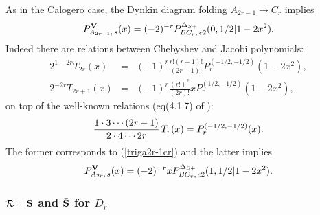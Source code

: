 \documentclass[a4paper,12pt]{article}
\begin{document}
As in the Calogero case, the Dynkin diagram folding $A_{2r-1}\to C_r$ implies
\begin{equation}
   P_{A_{2r-1},\,s}^{\bf V}(x)
   =(-2)^{-r}P_{BC_r,\,c2}^{\Delta_{S+}}(0,1/2|1-2x^2).
   \label{triga2r-1cr}
\end{equation}
Indeed there are relations between Chebyshev and Jacobi polynomials:
\begin{eqnarray}
   2^{1-2r}T_{2r}(x)&\!\!=\!\!&
   (-1)^r\frac{r!(r-1)!}{(2r-1)!}P_r^{(-1/2,-1/2)}(1-2x^2),
   \label{ChebJaco1}\\
%
   2^{-2r}T_{2r+1}(x)&\!\!=\!\!&
   (-1)^r\frac{(r!)^2}{(2r)!}xP_r^{(1/2,-1/2)}(1-2x^2),
   \label{ChebJaco2}
\end{eqnarray}
on top of the well-known relations (eq(4.1.7) of \cite{szego}):
\[
{1\cdot3\cdots(2r-1)\over{2\cdot4\cdots2r}}\,T_r(x)=
P_r^{(-1/2,-1/2)}(x).
\]
The former corresponds to (\ref{triga2r-1cr}) and the latter implies
\begin{equation}
   P_{A_{2r},\,s}^{\bf V}(x)
   =(-2)^{-r}xP_{BC_r,\,c2}^{\Delta_{S+}}(1,1/2|1-2x^2).
\end{equation}

\subsubsection{${\cal R}={\bf S}$ and $\bar{\bf S}$ for $D_r$}
\end{document}
